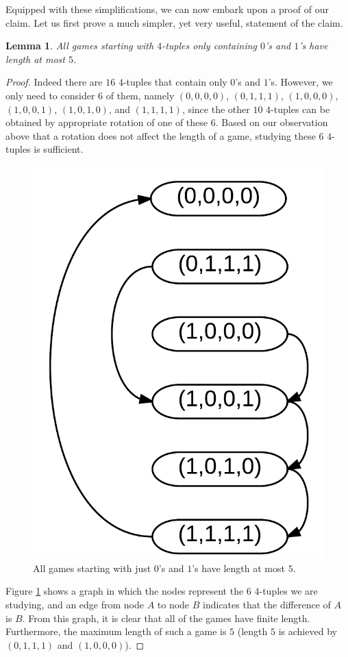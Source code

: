 \documentclass[12pt]{amsart}
\newtheorem{lemma}[theorem]{Lemma}
\begin{document}
Equipped with these simplifications, we can now embark upon a proof of our claim. Let us first prove a much simpler, yet very useful, statement of the claim.

\begin{lemma}
All games starting with $4$-tuples only containing $0$'s and $1$'s have length at most $5$.
\label{lem:zerosones}
\end{lemma}

\begin{proof}
Indeed there are $16$ $4$-tuples that contain only $0$'s and $1$'s. However, we only need to consider $6$ of them, namely $(0,0,0,0)$, $(0,1,1,1)$, $(1,0,0,0)$, $(1,0,0,1)$, $(1,0,1,0)$, and $(1,1,1,1)$, since the other $10$ $4$-tuples can be obtained by appropriate rotation of one of these $6$. Based on our observation above that a rotation does not affect the length of a game, studying these $6$ $4$-tuples is sufficient.

\begin{figure}
\includegraphics{number_squares_0s_and_1s.png}
\caption{All games starting with just $0$'s and $1$'s have length at most $5$.}
\label{fig:zerosones}
\end{figure}

Figure \ref{fig:zerosones} shows a graph in which the nodes represent the $6$ $4$-tuples we are studying, and an edge from node $A$ to node $B$ indicates that the difference of $A$ is $B$. From this graph, it is clear that all of the games have finite length. Furthermore, the maximum length of such a game is $5$ (length $5$ is achieved by $(0,1,1,1)$ and $(1,0,0,0)$).

\end{proof}
\end{document}
